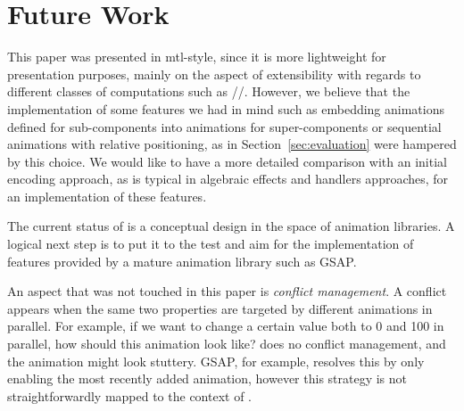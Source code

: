 \section{Future Work}
\label{sec:future}

This paper was presented in mtl-style, since it is more lightweight for presentation purposes, mainly on the aspect of extensibility with regards to different classes of computations such as //. However, we believe that the implementation of some features we had in mind such as embedding animations defined for sub-components into animations for super-components or sequential animations with relative positioning, as in Section~\ref{sec:evaluation} were hampered by this choice. We would like to have a more detailed comparison with an initial encoding approach, as is typical in algebraic effects and handlers approaches, for an implementation of these features.

The current status of \dsl{} is a conceptual design in the space of animation libraries. A logical next step is to put it to the test and aim for the implementation of features provided by a mature animation library such as GSAP.

An aspect that was not touched in this paper is \emph{conflict management}. A conflict appears when the same two properties are targeted by different animations in parallel. For example, if we want to change a certain value both to 0 and 100 in parallel, how should this animation look like? \dsl{} does no conflict management, and the animation might look stuttery. GSAP, for example, resolves this by only enabling the most recently added animation, however this strategy is not straightforwardly mapped to the context of \dsl{}.

